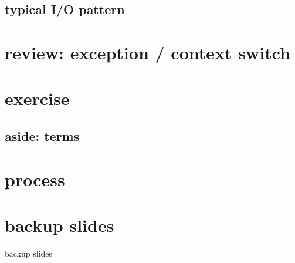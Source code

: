 \subsection{typical I/O pattern}




\section{review: exception / context switch}


\section{exercise}


\subsection{aside: terms}


\section{process}








\begin{frame}
    \titlepage
\end{frame}





\section{backup slides}
\begin{frame}{backup slides}
\end{frame}



